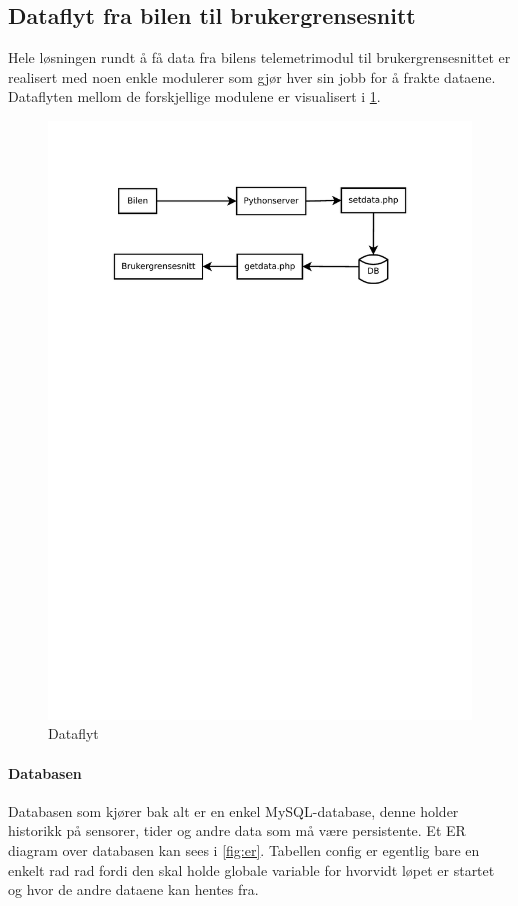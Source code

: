 \label{sec:losning}
\subsection{Dataflyt fra bilen til brukergrensesnitt}
Hele løsningen rundt å få data fra bilens telemetrimodul til brukergrensesnittet er realisert med noen enkle modulerer som gjør hver sin jobb for å frakte dataene. Dataflyten mellom de forskjellige modulene er visualisert i \ref{fig:dataflow}.

\begin{figure}[H]
\includegraphics[width=\textwidth, trim=0 540 0 75]{images/dataflow.pdf}
\caption{Dataflyt}
\label{fig:dataflow}
\end{figure}

\paragraph{Databasen}
Databasen som kjører bak alt er en enkel MySQL-database, denne holder historikk på sensorer, tider og andre data som må være persistente. Et ER diagram over databasen kan sees i \ref{fig:er}. Tabellen config er egentlig bare en enkelt rad rad fordi den skal holde globale variable for hvorvidt løpet er startet og hvor de andre dataene kan hentes fra.

